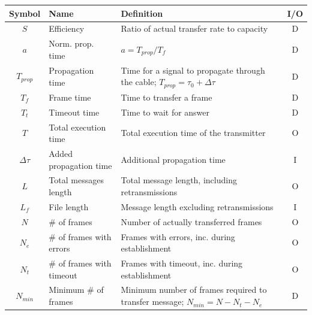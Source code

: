\documentclass[a4paper, 11pt]{report}
\begin{document}
\begin{center}
	\small
	\begin{tabular}{c | l | p{80mm} | c}
		\hline \hline
		\textbf{Symbol} & \textbf{Name}               & \textbf{Definition}                                                                & I/O \\ \hline
		$S$              & Efficiency                  & Ratio of actual transfer rate to capacity                                          & D   \\
		$a$              & Norm. prop. time            & $a = T_{prop}/T_f$                                                                 & D   \\
		$T_{prop}$       & Propagation time            & Time for a signal to propagate through the cable; $T_{prop} = \tau_0 + \Delta\tau$ & D   \\
		$T_f$            & Frame time                  & Time to transfer a frame                                                           & D   \\
		$T_t$            & Timeout time                & Time to wait for answer                                                            & D   \\
		$T$              & Total execution time        & Total execution time of the transmitter                                            & O   \\
		$\Delta\tau$     & Added propagation time      & Additional propagation time                                                        & I   \\
		$L$              & Total messages length       & Total message length, including retransmissions                                    & O   \\
		$L_f$            & File length                 & Message length excluding retransmissions                                           & I   \\
		$N$				 & \# of frames                & Number of actually transferred frames                                              & O   \\
		$N_e$            & \# of frames with errors    & Frames with errors, inc. during establishment                                      & O   \\
		$N_t$            & \# of frames with timeout   & Frames with timeout, inc. during establishment                                     & O   \\
		$N_{min}$        & Minimum \# of frames        & Minimum number of frames required to transfer message; $N_{min} = N-N_t-N_e$       & D   \\

\end{tabular}
\end{center}
\end{document}
